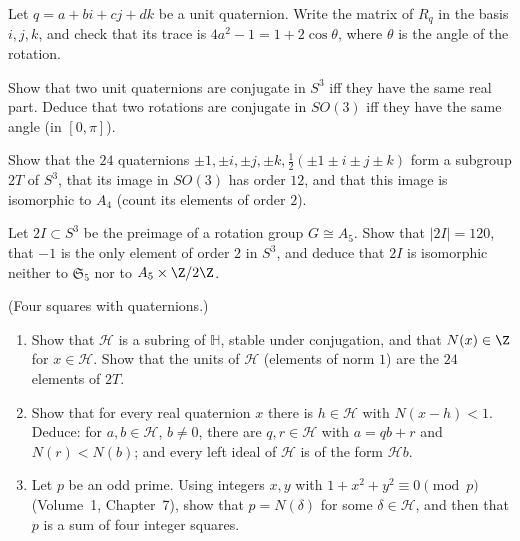 \begin{exercise}[$\star\star$]\label{ex:rotmatrix}
Let $q=a+bi+cj+dk$ be a unit quaternion. Write the matrix of $R_q$ in the basis $i,j,k$, and check that its trace is $4a^2-1=1+2\cos\theta$, where $\theta$ is the angle of the rotation.
\end{exercise}

\begin{exercise}[$\star\star$]\label{ex:conjS3}
Show that two unit quaternions are conjugate in $S^3$ iff they have the same real part. Deduce that two rotations are conjugate in $SO(3)$ iff they have the same angle (in $[0,\pi]$).
\end{exercise}

\begin{exercise}[$\star\star$]\label{ex:2T}
Show that the $24$ quaternions $\pm1,\pm i,\pm j,\pm k,\frac12(\pm1\pm i\pm j\pm k)$ form a subgroup $2T$ of $S^3$, that its image in $SO(3)$ has order $12$, and that this image is isomorphic to $A_4$ (count its elements of order $2$).
\end{exercise}

\begin{exercise}[$\star\star$]\label{ex:2I}
Let $2I\subset S^3$ be the preimage of a rotation group $G\cong A_5$. Show that $|2I|=120$, that $-1$ is the only element of order $2$ in $S^3$, and deduce that $2I$ is isomorphic neither to $\mathfrak S_5$ nor to $A_5\times\Z/2\Z$.
\end{exercise}

\begin{exercise}[$\star\star\star$]\label{ex:hurwitz}
(Four squares with quaternions.)
\begin{enumerate}[label=(\alph*)]
\item Show that $\mathcal H$ is a subring of $\mathbb H$, stable under conjugation, and that $N(x)\in\Z$ for $x\in\mathcal H$. Show that the units of $\mathcal H$ (elements of norm $1$) are the $24$ elements of $2T$.
\item Show that for every real quaternion $x$ there is $h\in\mathcal H$ with $N(x-h)<1$. Deduce: for $a,b\in\mathcal H$, $b\ne0$, there are $q,r\in\mathcal H$ with $a=qb+r$ and $N(r)<N(b)$; and every left ideal of $\mathcal H$ is of the form $\mathcal Hb$.
\item Let $p$ be an odd prime. Using integers $x,y$ with $1+x^2+y^2\equiv0\pmod p$ (Volume~1, Chapter~7), show that $p=N(\delta)$ for some $\delta\in\mathcal H$, and then that $p$ is a sum of four integer squares.
\end{enumerate}
\end{exercise}

